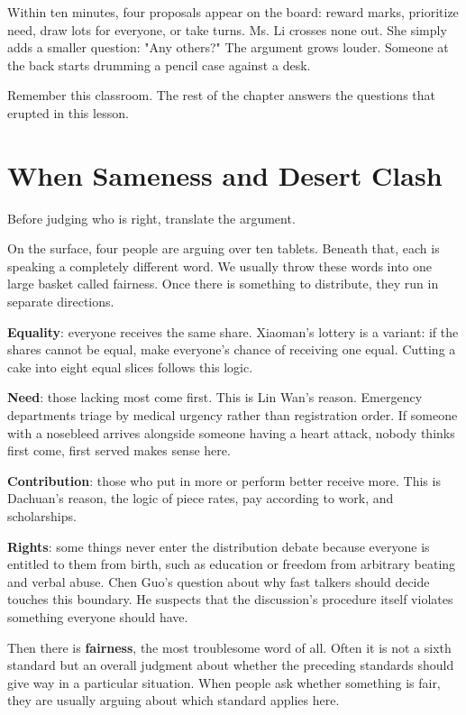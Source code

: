 Within ten minutes, four proposals appear on the board: reward marks, prioritize need, draw lots for everyone, or take turns. Ms. Li crosses none out. She simply adds a smaller question: "Any others?" The argument grows louder. Someone at the back starts drumming a pencil case against a desk.

Remember this classroom. The rest of the chapter answers the questions that erupted in this lesson.

\section{When Sameness and Desert Clash}
Before judging who is right, translate the argument.

On the surface, four people are arguing over ten tablets. Beneath that, each is speaking a completely different word. We usually throw these words into one large basket called fairness. Once there is something to distribute, they run in separate directions.

\textbf{Equality}: everyone receives the same share. Xiaoman's lottery is a variant: if the shares cannot be equal, make everyone's chance of receiving one equal. Cutting a cake into eight equal slices follows this logic.

\textbf{Need}: those lacking most come first. This is Lin Wan's reason. Emergency departments triage by medical urgency rather than registration order. If someone with a nosebleed arrives alongside someone having a heart attack, nobody thinks first come, first served makes sense here.

\textbf{Contribution}: those who put in more or perform better receive more. This is Dachuan's reason, the logic of piece rates, pay according to work, and scholarships.

\textbf{Rights}: some things never enter the distribution debate because everyone is entitled to them from birth, such as education or freedom from arbitrary beating and verbal abuse. Chen Guo's question about why fast talkers should decide touches this boundary. He suspects that the discussion's procedure itself violates something everyone should have.

Then there is \textbf{fairness}, the most troublesome word of all. Often it is not a sixth standard but an overall judgment about whether the preceding standards should give way in a particular situation. When people ask whether something is fair, they are usually arguing about which standard applies here.


